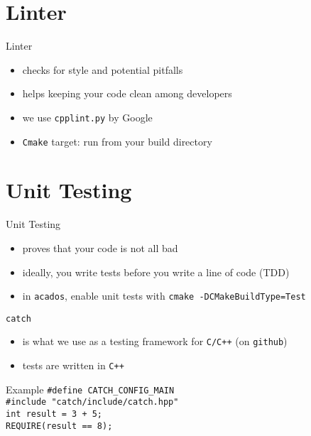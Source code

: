 \documentclass[10pt]{beamer}
\begin{document}
\section{Linter}

\begin{frame}{Linter}
	\begin{itemize}
		\item checks for style and potential pitfalls
		\item helps keeping your code clean among developers
		\item we use \texttt{cpplint.py} by Google
		\item \texttt{Cmake} target: run  from your build directory
	\end{itemize}
\end{frame}

\section{Unit Testing}

\begin{frame}{Unit Testing}
	\begin{itemize}
		\item proves that your code is not all bad
		\item ideally, you write tests before you write a line of code (TDD)
		\item in \texttt{acados}, enable unit tests with \texttt{cmake -DCMakeBuildType=Test}
	\end{itemize}
	\texttt{catch}
	\begin{itemize}
		\item is what we use as a testing framework for \texttt{C/C++} (on \texttt{github})
		\item tests are written in \texttt{C++}
	\end{itemize}
	\begin{beamerboxesrounded}{Example}
		\texttt{\#define CATCH\_CONFIG\_MAIN} \\
		\texttt{\#include "catch/include/catch.hpp"}\\ 
		\newline
		\texttt{int result = 3 + 5;} \\
		\texttt{REQUIRE(result == 8);}
	\end{beamerboxesrounded}
\end{frame}
\end{document}
